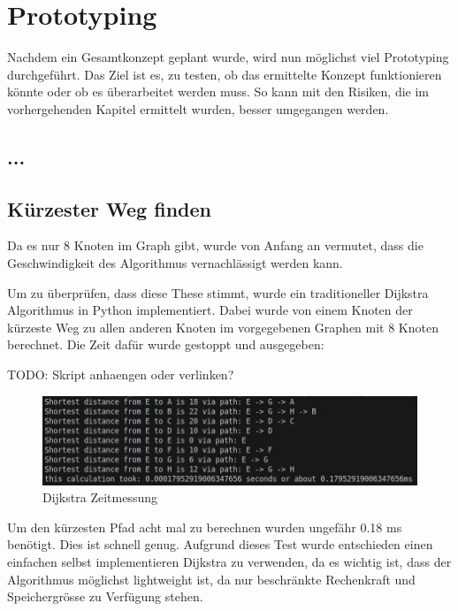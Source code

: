 \section{Prototyping}

Nachdem ein Gesamtkonzept geplant wurde, wird nun möglichst viel Prototyping durchgeführt. Das Ziel ist es, zu testen, ob das ermittelte Konzept funktionieren könnte oder ob es überarbeitet werden muss. So kann mit den Risiken, die im vorhergehenden Kapitel ermittelt wurden, besser umgegangen werden.

\subsection{...}

\subsection{Kürzester Weg finden}

Da es nur 8 Knoten im Graph gibt, wurde von Anfang an vermutet, dass die Geschwindigkeit des Algorithmus vernachlässigt werden kann.

Um zu überprüfen, dass diese These stimmt, wurde ein traditioneller Dijkstra Algorithmus in Python implementiert. Dabei wurde von einem Knoten der kürzeste Weg zu allen anderen Knoten im vorgegebenen Graphen mit 8 Knoten berechnet. Die Zeit dafür wurde gestoppt und ausgegeben:

TODO: Skript anhaengen oder verlinken?

\begin{figure}[H]
\centering
\includegraphics[width=\textwidth -30mm]{assets/informatik-prototyp/dijkstra-time.jpeg}
\caption{Dijkstra Zeitmessung}
\label{fig:dijkstra-time}
\end{figure}

Um den kürzesten Pfad acht mal zu berechnen wurden ungefähr 0.18 ms benötigt. Dies ist schnell genug. Aufgrund dieses Test wurde entschieden einen einfachen selbst implementieren Dijkstra zu verwenden, da es wichtig ist, dass der Algorithmus möglichst lightweight ist, da nur beschränkte Rechenkraft und Speichergrösse zu Verfügung stehen.


